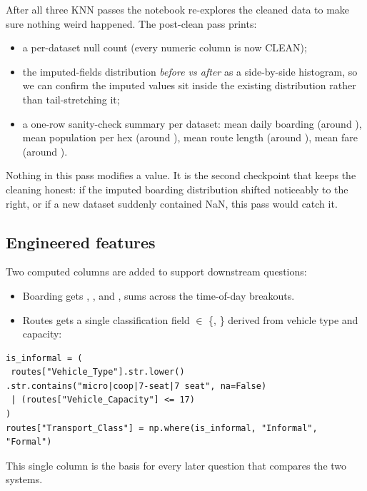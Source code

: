 After all three KNN passes the notebook re-explores the cleaned data
to make sure nothing weird happened. The post-clean pass prints:

\begin{itemize}
  \item a per-dataset null count (every numeric column is now CLEAN);
  \item the imputed-fields distribution \emph{before vs after} as a
        side-by-side histogram, so we can confirm the imputed values
        sit inside the existing distribution rather than tail-stretching
        it;
  \item a one-row sanity-check summary per dataset: mean daily
        boarding (around ), mean population per hex
        (around ), mean route length (around ),
        mean fare (around ).
\end{itemize}

Nothing in this pass modifies a value. It is the second checkpoint
that keeps the cleaning honest: if the imputed boarding distribution
shifted noticeably to the right, or if a new dataset suddenly
contained NaN, this pass would catch it.

\subsection{Engineered features}

Two computed columns are added to support downstream questions:

\begin{itemize}
 \item Boarding gets ,
 , and 
, sums across the time-of-day breakouts.
 \item Routes gets a single classification field
  $\in$ \{, \}
 derived from vehicle type and capacity:
\end{itemize}

\begin{lstlisting}[caption={Formal/Informal classification on Routes.}]
is_informal = (
 routes["Vehicle_Type"].str.lower()
.str.contains("micro|coop|7-seat|7 seat", na=False)
 | (routes["Vehicle_Capacity"] <= 17)
)
routes["Transport_Class"] = np.where(is_informal, "Informal", "Formal")
\end{lstlisting}

This single column is the basis for every later question that compares
the two systems.
